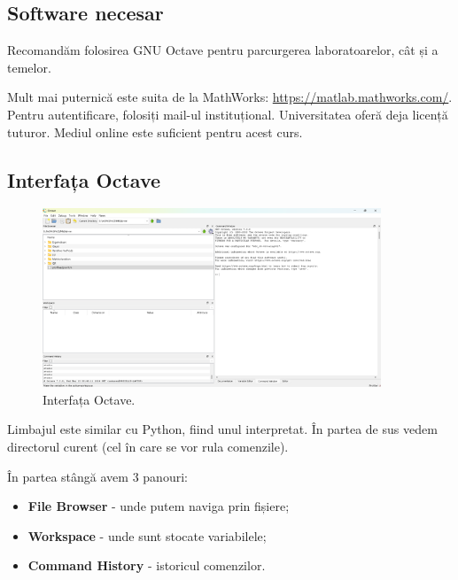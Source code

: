 \documentclass{exam}
\begin{document}
\subsection{Software necesar}

\par Recomandăm folosirea GNU Octave pentru parcurgerea laboratoarelor, cât și a temelor.

\par Mult mai puternică este suita de la MathWorks: \url{https://matlab.mathworks.com/}.
Pentru autentificare, folosiți mail-ul instituțional.
Universitatea oferă deja licență tuturor. Mediul online este suficient pentru
acest curs.

\newpage
\subsection{Interfața Octave}

\begin{figure}[ht]
	\centering
	\includegraphics[width=0.9\textwidth]{interf}
	\caption{Interfața Octave.}
\end{figure}

\par Limbajul este similar cu Python, fiind unul interpretat. În partea de sus
vedem directorul curent (cel în care se vor rula comenzile).

\par În partea stângă avem 3 panouri:

\begin{itemize}
	\item \textbf{File Browser} - unde putem naviga prin fișiere;
	\item \textbf{Workspace} - unde sunt stocate variabilele;
	\item \textbf{Command History} - istoricul comenzilor.
\end{itemize}
\end{document}
